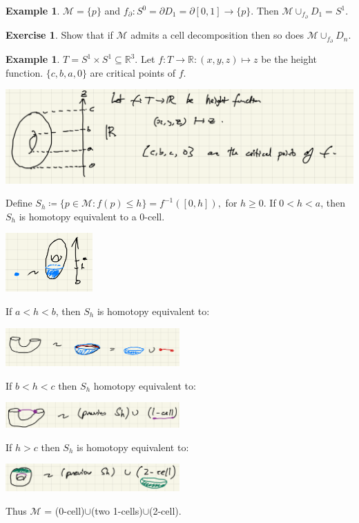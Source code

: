 \documentclass[10pt]{article}
\theoremstyle{plain}
\theoremstyle{definition}
\newtheorem{exmp}[thm]{Example} %
\newtheorem{exercise}[thm]{Exercise}
\newcommand{\Real}{\mathbb{R}}
\newcommand{\man}{\mathcal{M}}
\newcommand{\inter}{\left[0,1\right]}
\begin{document}
\begin{exmp}
     $\man = \{p\}$ and $f_\partial : S^0 = \partial D_1 = \partial \inter \to \{p\}.$ Then $\man \cup_{f_\partial}D_1 = S^1$.
\end{exmp}

\begin{exercise}
    Show that if $\man$ admits a cell decomposition then so does $\man \cup_{f_\partial} D_n$.
\end{exercise}

\begin{exmp}
    $T = S^1 \times S^1 \subseteq \Real^3$. Let $f:T\to \Real:(x,y,z)\mapsto z$ be the height function. $\{c,b,a,0\}$ are critical points of $f$.
    \begin{center}
        \includegraphics[width=1\textwidth]{Images/TorusCellDecomposition.png}
    \end{center}
    Define $S_h \coloneqq \{p\in\man : f(p) \leq h\} = f^{-1}([0,h]), $ for $h\geq 0$. If $0<h<a$, then $S_h$ is homotopy equivalent to a 0-cell.
    \begin{center}
        \includegraphics[width=0.25\textwidth]{Images/MorseTorusTrivialHomotopy.png}
    \end{center}
    If $a<h<b$, then $S_h$ is homotopy equivalent to:    
    \begin{center}
        \includegraphics[width=0.5\textwidth]{Images/MorseTorusHomotopyOneCell.png}
    \end{center}
    If $b<h<c$ then $S_h$ homotopy equivalent to:
    \begin{center}
        \includegraphics[width = 0.5\textwidth]{Images/MorseTorusHomotopyOneCellWithZeroCell.png}
    \end{center}
    If $h>c$ then $S_h$ is homotopy equivalent to:
    \begin{center}
        \includegraphics[width=0.5\textwidth]{Images/MorseTorusHomotopyFullTorus.png}
    \end{center}
    Thus $\man$ = (0-cell)$\cup$(two 1-cells)$\cup$(2-cell).
\end{exmp}
\end{document}
